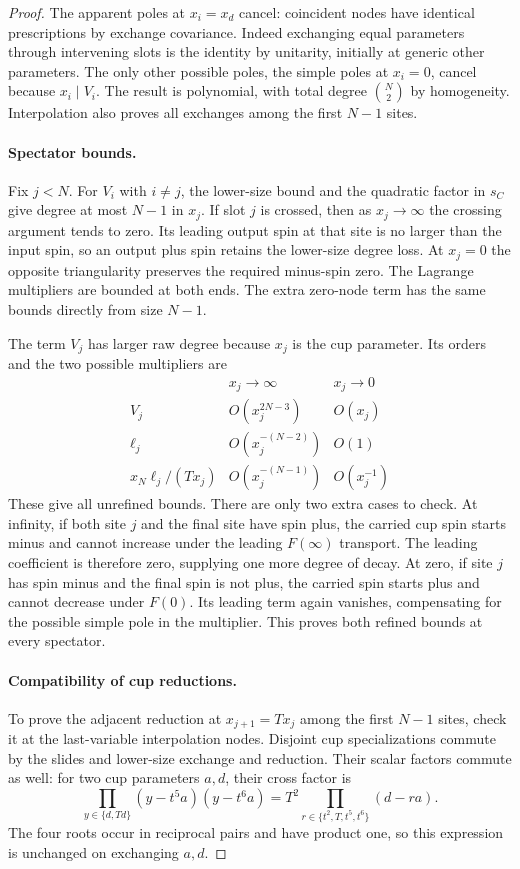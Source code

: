 \begin{proof}
The apparent poles at \(x_i=x_d\) cancel: coincident nodes have
identical prescriptions by exchange covariance. Indeed exchanging
equal parameters through intervening slots is the identity by
unitarity, initially at generic other parameters. The only other
possible poles, the simple poles at \(x_i=0\), cancel because
\(x_i\mid V_i\). The result is polynomial, with total degree
\(\binom N2\) by homogeneity. Interpolation also proves all exchanges
among the first \(N-1\) sites.

\paragraph{Spectator bounds.}
Fix \(j<N\). For \(V_i\) with \(i\ne j\), the lower-size bound
and the quadratic factor in \(s_C\) give degree at most \(N-1\)
in \(x_j\). If slot \(j\) is crossed, then as \(x_j\to\infty\)
the crossing argument tends to zero. Its leading output spin at that
site is no larger than the input spin, so an output plus spin retains
the lower-size degree loss. At \(x_j=0\) the opposite triangularity
preserves the required minus-spin zero. The Lagrange multipliers are
bounded at both ends. The extra zero-node term has the same bounds
directly from size \(N-1\).

The term \(V_j\) has larger raw degree because \(x_j\) is the cup
parameter. Its orders and the two possible multipliers are
\[
\begin{array}{c|cc}
 &x_j\to\infty&x_j\to0\\ \hline
 V_j&O(x_j^{2N-3})&O(x_j)\\
 \ell_j&O(x_j^{-(N-2)})&O(1)\\
 x_N\ell_j/(Tx_j)&O(x_j^{-(N-1)})&O(x_j^{-1})
\end{array}
\]
These give all unrefined bounds. There are only two extra cases to
check. At infinity, if both site \(j\) and the final site have spin
plus, the carried cup spin starts minus and cannot increase under
the leading \(F(\infty)\) transport. The leading coefficient is
therefore zero, supplying one more degree of decay. At zero, if
site \(j\) has spin minus and the final spin is not plus, the carried
spin starts plus and cannot decrease under \(F(0)\). Its leading
term again vanishes, compensating for the possible simple pole in
the multiplier. This proves both refined bounds at every spectator.

\paragraph{Compatibility of cup reductions.}
To prove the adjacent reduction at \(x_{j+1}=Tx_j\) among the first
\(N-1\) sites, check it at the last-variable interpolation nodes.
Disjoint cup specializations commute by the slides and lower-size
exchange and reduction. Their scalar factors commute as well: for
two cup parameters \(a,d\), their cross factor is
\[
 \prod_{y\in\{d,Td\}}(y-t^5a)(y-t^6a)
 =T^2\prod_{r\in\{t^2,T,t^5,t^6\}}(d-ra).
\]
The four roots occur in reciprocal pairs and have product one, so
this expression is unchanged on exchanging \(a,d\).


\end{proof}
